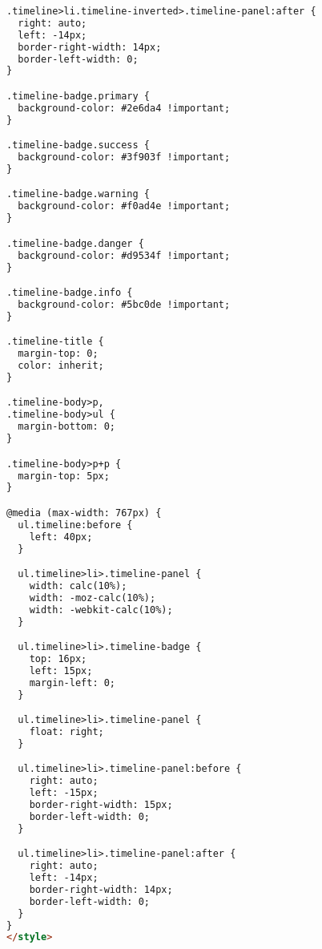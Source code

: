 \begin{lstlisting}[language=HTML]
.timeline>li.timeline-inverted>.timeline-panel:after {
  right: auto;
  left: -14px;
  border-right-width: 14px;
  border-left-width: 0;
}

.timeline-badge.primary {
  background-color: #2e6da4 !important;
}

.timeline-badge.success {
  background-color: #3f903f !important;
}

.timeline-badge.warning {
  background-color: #f0ad4e !important;
}

.timeline-badge.danger {
  background-color: #d9534f !important;
}

.timeline-badge.info {
  background-color: #5bc0de !important;
}

.timeline-title {
  margin-top: 0;
  color: inherit;
}

.timeline-body>p,
.timeline-body>ul {
  margin-bottom: 0;
}

.timeline-body>p+p {
  margin-top: 5px;
}

@media (max-width: 767px) {
  ul.timeline:before {
    left: 40px;
  }

  ul.timeline>li>.timeline-panel {
    width: calc(10%);
    width: -moz-calc(10%);
    width: -webkit-calc(10%);
  }

  ul.timeline>li>.timeline-badge {
    top: 16px;
    left: 15px;
    margin-left: 0;
  }

  ul.timeline>li>.timeline-panel {
    float: right;
  }

  ul.timeline>li>.timeline-panel:before {
    right: auto;
    left: -15px;
    border-right-width: 15px;
    border-left-width: 0;
  }

  ul.timeline>li>.timeline-panel:after {
    right: auto;
    left: -14px;
    border-right-width: 14px;
    border-left-width: 0;
  }
}
</style>
\end{lstlisting}
